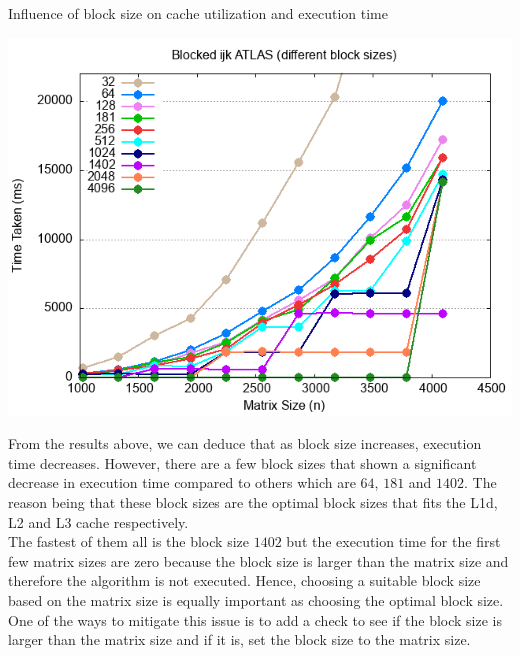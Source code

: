 \documentclass[12pt]{article}
\begin{document}
\begin{section}{Influence of block size on cache utilization and execution time}
 \begin{center}
     \includegraphics*[]{images/atlas_block_combined.png}
 \end{center}

 From the results above, we can deduce that as block size increases, execution time decreases. However, there are a few
 block sizes that shown a significant decrease in execution time compared to others which are $64$, $181$ and $1402$.
 The reason being that these block sizes are the optimal block sizes that fits the L1d, L2 and L3 cache respectively. \\

 The fastest of them all is the block size $1402$ but the execution time for the first few matrix sizes are zero because
 the block size is larger than the matrix size and therefore the algorithm is not executed. Hence, choosing a suitable
 block size based on the matrix size is equally important as choosing the optimal block size. One of the ways to mitigate
 this issue is to add a check to see if the block size is larger than the matrix size and if it is, set the block size to
 the matrix size.
\end{section}
\end{document}
